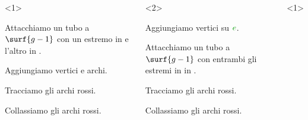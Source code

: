 \begin{frame}[fragile]
\begin{overprint}
\vspace{-1.5em}
\end{overprint}
\begin{overprint}
\begin{columns}[onlytextwidth]
\begin{onlyenv}<1>
\begin{enumarabic}
\item Attacchiamo un tubo a $\surf{g-1}$ con un estremo in \DOne{} e l'altro in \DTwo{}.
\item Aggiungiamo vertici e archi.
\item Tracciamo gli archi rossi.
\item Collassiamo gli archi rossi.
\end{enumarabic}
\end{onlyenv}
\begin{onlyenv}<2>
\begin{enumarabic}
\item Aggiungiamo vertici su $\color{green!60!black}e$.
\item Attacchiamo un tubo a $\surf{g-1}$ con entrambi gli estremi in in \DOne{}.
\item Tracciamo gli archi rossi.
\item Collassiamo gli archi rossi.
\end{enumarabic}
\end{onlyenv}
\begin{onlyenv}<1>
\def\picturesetupzero#1{
\pic{cmove setting two disks};
\path \surfcirclepoint{d1}{-90} coordinate (x-2);
\path \surfcirclepoint{d2}{-90} coordinate (y-2);
\ifnum#1=0
\path (x-2) pic{black vertex} node[below=3pt] {$x-2$};
\path (y-2) pic{black vertex} node[below=3pt] {$y-2$};
\fi
}
\def\picturesetupone#1{
\picturesetupzero{#1}
\pic{cmove setting two disks tube};
\tubefill{white};
}
\def\picturesetuptwo#1{
\picturesetupone{#1}
\tubebelt{black edge}{black edge dashed}
\path \tubemiddlepoint{90} coordinate (w1) pic{white vertex};
\path \tubemiddlepoint{135} coordinate (b1) pic{black vertex};
\path \tubemiddlepoint{180} coordinate (w2) pic {white vertex};
\path \tubemiddlepoint{225} coordinate (b2) pic {black vertex};
}
\end{onlyenv}
\end{columns}
\end{overprint}
\end{frame}

